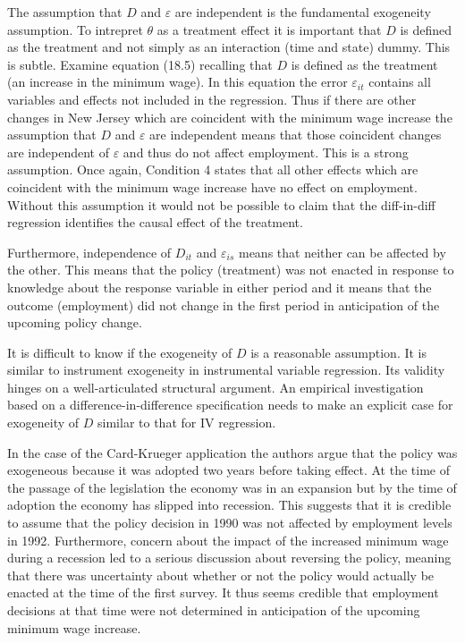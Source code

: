 \documentclass[10pt]{article}
\begin{document}
The assumption that $D$ and $\varepsilon$ are independent is the fundamental exogeneity assumption. To intrepret $\theta$ as a treatment effect it is important that $D$ is defined as the treatment and not simply as an interaction (time and state) dummy. This is subtle. Examine equation (18.5) recalling that $D$ is defined as the treatment (an increase in the minimum wage). In this equation the error $\varepsilon_{i t}$ contains all variables and effects not included in the regression. Thus if there are other changes in New Jersey which are coincident with the minimum wage increase the assumption that $D$ and $\varepsilon$ are independent means that those coincident changes are independent of $\varepsilon$ and thus do not affect employment. This is a strong assumption. Once again, Condition 4 states that all other effects which are coincident with the minimum wage increase have no effect on employment. Without this assumption it would not be possible to claim that the diff-in-diff regression identifies the causal effect of the treatment.

Furthermore, independence of $D_{i t}$ and $\varepsilon_{i s}$ means that neither can be affected by the other. This means that the policy (treatment) was not enacted in response to knowledge about the response variable in either period and it means that the outcome (employment) did not change in the first period in anticipation of the upcoming policy change.

It is difficult to know if the exogeneity of $D$ is a reasonable assumption. It is similar to instrument exogeneity in instrumental variable regression. Its validity hinges on a well-articulated structural argument. An empirical investigation based on a difference-in-difference specification needs to make an explicit case for exogeneity of $D$ similar to that for IV regression.

In the case of the Card-Krueger application the authors argue that the policy was exogeneous because it was adopted two years before taking effect. At the time of the passage of the legislation the economy was in an expansion but by the time of adoption the economy has slipped into recession. This suggests that it is credible to assume that the policy decision in 1990 was not affected by employment levels in 1992. Furthermore, concern about the impact of the increased minimum wage during a recession led to a serious discussion about reversing the policy, meaning that there was uncertainty about whether or not the policy would actually be enacted at the time of the first survey. It thus seems credible that employment decisions at that time were not determined in anticipation of the upcoming minimum wage increase.
\end{document}
